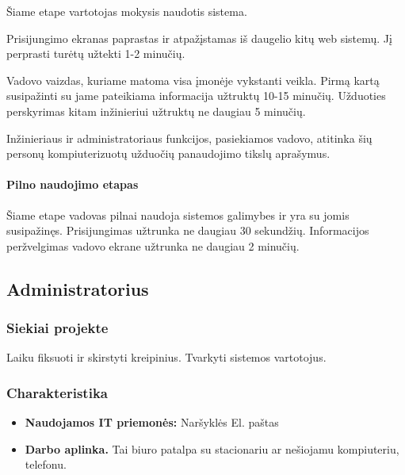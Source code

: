 			Šiame etape vartotojas mokysis naudotis sistema.
			
			Prisijungimo ekranas paprastas ir atpažįstamas iš daugelio kitų web sistemų.
			Jį perprasti turėtų užtekti 1-2 minučių.

			Vadovo vaizdas, kuriame matoma visa įmonėje vykstanti veikla.
			Pirmą kartą susipažinti su jame pateikiama informacija užtruktų 10-15 minučių.
			Užduoties perskyrimas kitam inžinieriui užtruktų ne daugiau 5 minučių.
						
			Inžinieriaus ir administratoriaus funkcijos, pasiekiamos vadovo, atitinka šių personų kompiuterizuotų užduočių panaudojimo tikslų aprašymus.
			
			\setcounter{tocdepth}{5} \setcounter{secnumdepth}{5}
			
			\paragraph{Pilno naudojimo etapas}
			
			Šiame etape vadovas pilnai naudoja sistemos galimybes ir yra su jomis susipažinęs.
			Prisijungimas užtrunka ne daugiau 30 sekundžių. Informacijos peržvelgimas vadovo ekrane užtrunka ne daugiau 2 minučių.
			
			
	
	\subsection{Administratorius}
	
		\subsubsection{Siekiai projekte}
		
		Laiku fiksuoti ir skirstyti kreipinius. Tvarkyti sistemos vartotojus. 
		
		\subsubsection{Charakteristika}
		
		\begin{itemize}
			\item \textbf{Naudojamos IT priemonės:}
				\subitem Naršyklės
				\subitem El. paštas
			\item \textbf{Darbo aplinka.}
			Tai biuro patalpa su stacionariu ar nešiojamu kompiuteriu, telefonu.
		\end{itemize}
			
